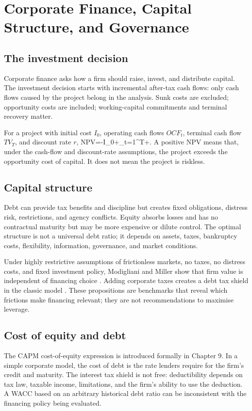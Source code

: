 \chapter{Corporate Finance, Capital Structure, and Governance}

\section{The investment decision}
Corporate finance asks how a firm should raise, invest, and distribute capital. The investment decision starts with incremental after-tax cash flows: only cash flows caused by the project belong in the analysis. Sunk costs are excluded; opportunity costs are included; working-capital commitments and terminal recovery matter.

For a project with initial cost $I_0$, operating cash flows $OCF_t$, terminal cash flow $TV_T$, and discount rate $r$,
  NPV=-I_0+\sum_{t=1}^{T}+.
\closeformula
A positive NPV means that, under the cash-flow and discount-rate assumptions, the project exceeds the opportunity cost of capital. It does not mean the project is riskless.

\section{Capital structure}
Debt can provide tax benefits and discipline but creates fixed obligations, distress risk, restrictions, and agency conflicts. Equity absorbs losses and has no contractual maturity but may be more expensive or dilute control. The optimal structure is not a universal debt ratio; it depends on assets, taxes, bankruptcy costs, flexibility, information, governance, and market conditions.

Under highly restrictive assumptions of frictionless markets, no taxes, no distress costs, and fixed investment policy, Modigliani and Miller show that firm value is independent of financing choice \cite{modigliani1958}. Adding corporate taxes creates a debt tax shield in the classic model \cite{modigliani1963}. These propositions are benchmarks that reveal which frictions make financing relevant; they are not recommendations to maximise leverage.

\section{Cost of equity and debt}
The CAPM cost-of-equity expression is introduced formally in Chapter 9. In a simple corporate model, the cost of debt is the rate lenders require for the firm's credit and maturity. The interest tax shield is not free: deductibility depends on tax law, taxable income, limitations, and the firm's ability to use the deduction. A WACC based on an arbitrary historical debt ratio can be inconsistent with the financing policy being evaluated.

